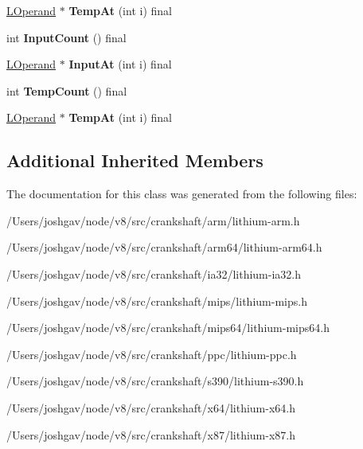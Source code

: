 \begin{DoxyCompactItemize}
\item 
\hyperlink{classv8_1_1internal_1_1_l_operand}{L\+Operand} $\ast$ {\bfseries Temp\+At} (int i) final\hypertarget{classv8_1_1internal_1_1_l_template_instruction_a6d87e46c8eafde1033995e41b872f3fc}{}\label{classv8_1_1internal_1_1_l_template_instruction_a6d87e46c8eafde1033995e41b872f3fc}

\item 
int {\bfseries Input\+Count} () final\hypertarget{classv8_1_1internal_1_1_l_template_instruction_a868eb55feeb60c10ee62f2ce34ff51df}{}\label{classv8_1_1internal_1_1_l_template_instruction_a868eb55feeb60c10ee62f2ce34ff51df}

\item 
\hyperlink{classv8_1_1internal_1_1_l_operand}{L\+Operand} $\ast$ {\bfseries Input\+At} (int i) final\hypertarget{classv8_1_1internal_1_1_l_template_instruction_a7a5cb225ddd3039e21b275539b4843a2}{}\label{classv8_1_1internal_1_1_l_template_instruction_a7a5cb225ddd3039e21b275539b4843a2}

\item 
int {\bfseries Temp\+Count} () final\hypertarget{classv8_1_1internal_1_1_l_template_instruction_a2b2647c9e0349c3e34f5c0e310db9d3d}{}\label{classv8_1_1internal_1_1_l_template_instruction_a2b2647c9e0349c3e34f5c0e310db9d3d}

\item 
\hyperlink{classv8_1_1internal_1_1_l_operand}{L\+Operand} $\ast$ {\bfseries Temp\+At} (int i) final\hypertarget{classv8_1_1internal_1_1_l_template_instruction_a6d87e46c8eafde1033995e41b872f3fc}{}\label{classv8_1_1internal_1_1_l_template_instruction_a6d87e46c8eafde1033995e41b872f3fc}

\end{DoxyCompactItemize}
\subsection*{Additional Inherited Members}


The documentation for this class was generated from the following files\+:\begin{DoxyCompactItemize}
\item 
/\+Users/joshgav/node/v8/src/crankshaft/arm/lithium-\/arm.\+h\item 
/\+Users/joshgav/node/v8/src/crankshaft/arm64/lithium-\/arm64.\+h\item 
/\+Users/joshgav/node/v8/src/crankshaft/ia32/lithium-\/ia32.\+h\item 
/\+Users/joshgav/node/v8/src/crankshaft/mips/lithium-\/mips.\+h\item 
/\+Users/joshgav/node/v8/src/crankshaft/mips64/lithium-\/mips64.\+h\item 
/\+Users/joshgav/node/v8/src/crankshaft/ppc/lithium-\/ppc.\+h\item 
/\+Users/joshgav/node/v8/src/crankshaft/s390/lithium-\/s390.\+h\item 
/\+Users/joshgav/node/v8/src/crankshaft/x64/lithium-\/x64.\+h\item 
/\+Users/joshgav/node/v8/src/crankshaft/x87/lithium-\/x87.\+h\end{DoxyCompactItemize}
